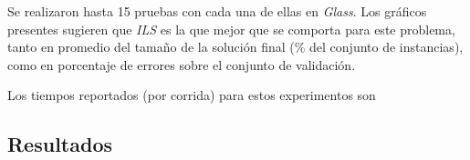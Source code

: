 \documentclass[11pt]{article}
\begin{document}
Se realizaron 
hasta 15 pruebas con cada una de ellas en \emph{Glass}. Los gráficos 
presentes sugieren que \emph{ILS} es la que mejor que se comporta para este problema, 
tanto en promedio del tamaño de la solución final (\% del conjunto de instancias), 
como en porcentaje de errores sobre el conjunto de validación.

Los tiempos reportados (por corrida) para estos experimentos son

\begin{table}[h]
\caption{Resultados para tamaño de solución}
\label{tabla:2}
\end{table}

\subsection{Resultados}

\begin{table}[h]
\caption{Resultados promedios para Abalone}
\label{tabla:3}
\end{table}

\begin{table}[h]
\caption{Resultados promedios para Australian}
\label{tabla:4}
\end{table}
\end{document}
